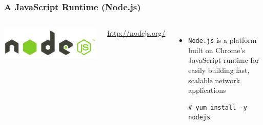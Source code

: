 \documentclass{beamer}
\begin{document}
\begin{frame}[fragile]
\frametitle{A JavaScript Runtime (Node.js)}
\begin{columns}
    \href{http://nodejs.org/}{\includegraphics[width = 1.0 \textwidth]{nodejs.eps}}
  
    \url{http://nodejs.org/}
  \begin{itemize}
   \item \texttt{Node.js} is a platform built on Chrome's JavaScript runtime for easily building fast, scalable network applications
   \lstset{language=shell, escapechar=!}
\begin{lstlisting}[escapechar=!]
# yum install -y nodejs
\end{lstlisting}
  \end{itemize}
\end{columns}


\end{frame}
\end{document}
